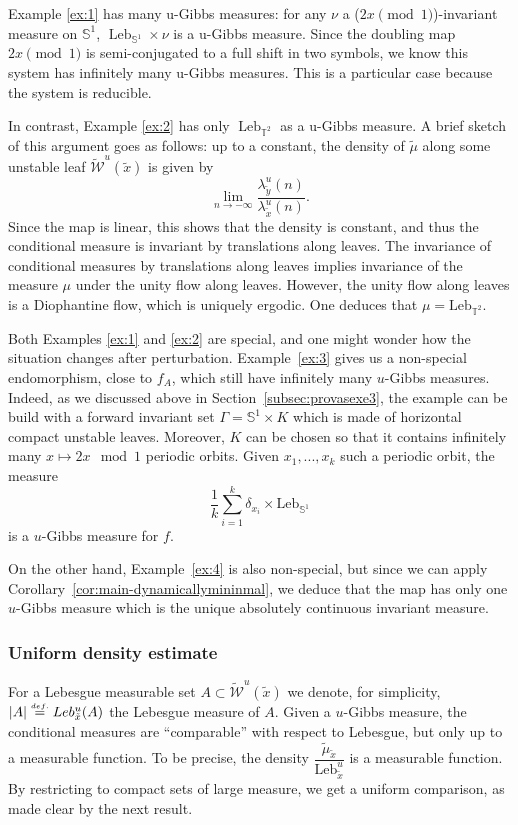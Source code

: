 \documentclass[a4paper,11pt,reqno]{amsart}
\newcommand{\TT}{{\mathbb{T}^2}}
\newcommand{\cW}{{\mathcal W}}
\newcommand{\eqdef}{\stackrel{\scriptscriptstyle\textrm def.}{=}}
\newcommand{\Leb}{\textrm{Leb}}
\newcommand{\tix}{\tilde{x}}
\newcommand{\tm}{\tilde{\mu}}
\newcommand{\w}{\widetilde{\cW}}
\theoremstyle{definition}
\begin{document}
Example \ref{ex:1} has many u-Gibbs measures: for any $\nu$ a ($2x \pmod 1$)-invariant measure on $\mathbb{S}^1$, $\operatorname{Leb}_{\mathbb{S}^1} \times \nu$ is a u-Gibbs measure. Since the doubling map $2x \pmod 1$ is semi-conjugated to a full shift in two symbols, we know this system has infinitely many u-Gibbs measures. This is a particular case because the system is reducible.

In contrast, Example \ref{ex:2} has only $\operatorname{Leb}_{\mathbb{T}^2}$ as a u-Gibbs measure. A brief sketch of this argument goes as follows: up to a constant, the density of $\tm$ along some unstable leaf $\w^u(\tix)$ is given by
\[
\lim_{n\to-\infty}\frac{\lambda^u_{\tilde{y}}(n)}{\lambda^u_{\tilde{x}}(n)}.
\]
Since the map is linear, this shows that the density is constant, and thus the conditional measure is invariant by translations along leaves. The invariance of conditional measures by translations along leaves implies invariance of the measure $\mu$ under the unity flow along leaves. However, the unity flow along leaves is a Diophantine flow, which is uniquely ergodic. One deduces that $\mu=\Leb_{\TT}$.

Both Examples \ref{ex:1} and \ref{ex:2} are special, and one might wonder how the situation changes after perturbation. Example~\ref{ex:3} gives us a non-special endomorphism, close to $f_A$, which still have infinitely many $u$-Gibbs measures. Indeed, as we discussed above in Section~\ref{subsec:provasexe3}, the example can be build with a forward invariant set $\Gamma=\mathbb{S}^1\times K$ which is made of horizontal compact unstable leaves. Moreover, $K$ can be chosen so that it contains infinitely many $x\mapsto 2x\mod 1$ periodic orbits. Given $x_1,...,x_k$ such a periodic orbit, the measure
\[
\frac{1}{k}\sum_{i=1}^k\delta_{x_i}\times\Leb_{\mathbb{S}^1}
\]
is a $u$-Gibbs measure for $f$. 

On the other hand, Example~\ref{ex:4} is also non-special, but since we can apply Corollary~\ref{cor:main-dynamicallymininmal}, we deduce that the map has only one $u$-Gibbs measure which is the unique absolutely continuous invariant measure. 

\subsubsection{Uniform density estimate}
For a Lebesgue measurable set $A\subset\widetilde{\cW}^u(\tix)$ we denote, for simplicity, $|A|\eqdef\Leb^u_{\tix}(A)$ the Lebesgue measure of $A$. Given a $u$-Gibbs measure, the conditional measures are ``comparable'' with respect to Lebesgue, but only up to a measurable function. To be precise, the density $\dfrac{\tilde{\mu}_{\tilde{x}}}{\Leb^u_{\tix}}$ is a measurable function. By restricting to compact sets of large measure, we get a uniform comparison, as made clear by the next result. 
\end{document}
